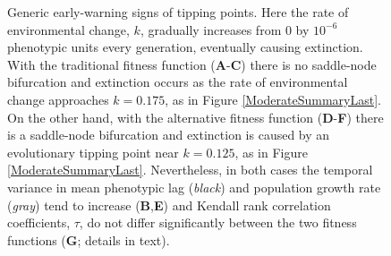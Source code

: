 \documentclass[12pt,letterpaper]{article} %
\begin{document}
\begin{figure}[!ht]
\centering
\caption{
Generic early-warning signs of tipping points.
Here the rate of environmental change, $k$, gradually increases from 0 by $10^{-6}$ phenotypic units every generation, eventually causing extinction.
With the traditional fitness function (\textbf{A}-\textbf{C}) there is no saddle-node bifurcation and extinction occurs as the rate of environmental change approaches $k=0.175$, as in Figure \ref{ModerateSummaryLast}.
On the other hand, with the alternative fitness function (\textbf{D}-\textbf{F}) there is a saddle-node bifurcation and extinction is caused by an evolutionary tipping point near $k = 0.125$, as in Figure \ref{ModerateSummaryLast}.
Nevertheless, in both cases the temporal variance in mean phenotypic lag (\textit{black}) and population growth rate (\textit{gray}) tend to increase (\textbf{B},\textbf{E}) and Kendall rank correlation coefficients, $\tau$, do not differ significantly between the two fitness functions (\textbf{G}; details in text). %
}
\end{figure}
\end{document}
